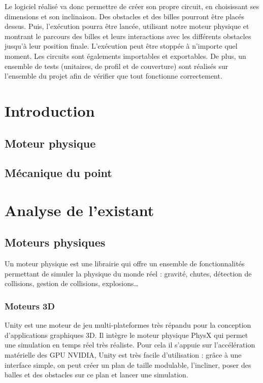 \documentclass{report}
\begin{document}
Le logiciel réalisé va donc permettre de créer son propre circuit, en choisissant ses dimensions et son inclinaison. Des obstacles et des billes pourront être placés dessus. Puis, l'exécution pourra être lancée, utilisant notre moteur physique et montrant le parcours des billes et leurs interactions avec les différents obstacles jusqu'à leur position finale. L'exécution peut être stoppée à n’importe quel moment. Les circuits sont égalements importables et exportables. De plus, un ensemble de tests (unitaires, de profil et de couverture) sont réalisés sur l’ensemble du projet afin de vérifier que tout fonctionne correctement. 


\tableofcontents

\chapter{Introduction}

\section{Moteur physique}

\section{Mécanique du point}

\chapter{Analyse de l'existant}

\section{Moteurs physiques}

Un moteur physique est une librairie qui offre un ensemble de fonctionnalités permettant de simuler la physique du monde réel : gravité, chutes, détection de collisions, gestion de collisions, explosions…


\subsection{Moteurs 3D}

Unity est une moteur de jeu multi-plateformes très répandu pour la conception d’applications graphiques 3D. Il intègre le moteur physique PhysX qui permet une simulation en temps réel très réaliste. Pour cela il s’appuie sur l’accélération matérielle des GPU NVIDIA, Unity est très facile d’utilisation : grâce à une interface simple, on peut créer un plan de taille modulable, l’incliner, poser des balles et des obstacles sur ce plan et lancer une simulation. 
\end{document}
